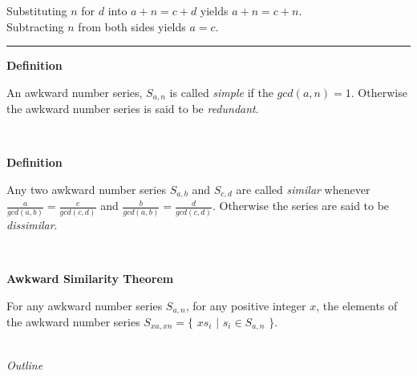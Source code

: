 \documentclass[a4paper,12pt]{article}
\begin{document}
\noindent Substituting $n$ for $d$ into $a + n = c + d$ yields $a + n = c + n$.\\

\noindent Subtracting $n$ from both sides yields $a = c$.

\begin{center}
\noindent\rule{8cm}{0.4pt}
\end{center}










\label{definition:simple_and_redundant_series}
\hypertarget{definition:simple_and_redundant_series}{}
\begin{tcolorbox}
\textbf{Definition}

An awkward number series, $S_{a,n}$ is called \textit{simple} if the $gcd(a,n) = 1$. Otherwise the awkward number series is said to be \textit{redundant}.

\end{tcolorbox}
\noindent \\









\label{definition:similar_series}
\hypertarget{definition:similar_series}{}
\begin{tcolorbox}
\textbf{Definition}

Any two awkward number series $S_{a,b}$ and $S_{c,d}$ are called \textit{similar} whenever $\frac{a}{gcd(a,b)} = \frac{c}{gcd(c,d)}$ and $\frac{b}{gcd(a,b)} = \frac{d}{gcd(c,d)}$. Otherwise the series are said to be \textit{dissimilar}.

\end{tcolorbox}
\noindent \\







\label{theorem:similar_theorem}
\hypertarget{theorem:similar_theorem}{}
\begin{tcolorbox}
\textbf{Awkward Similarity Theorem}

\noindent For any awkward number series $S_{a, n}$, for any positive integer $x$, the elements of the awkward number series $S_{xa, xn} = \{$ $xs_i$ $|$ $s_i \in S_{a,n}$ $\}$.
\end{tcolorbox}

\noindent \\
\textit{Outline}
\end{document}
